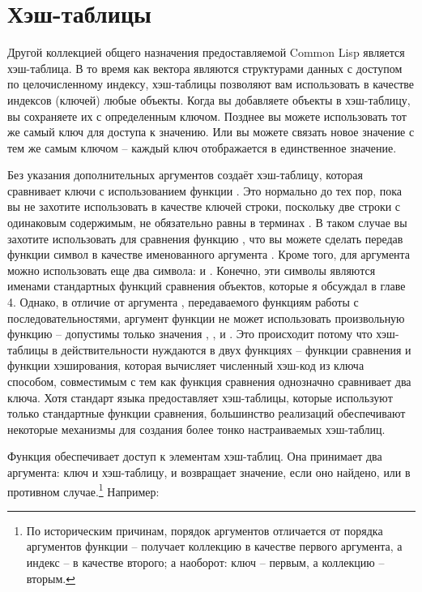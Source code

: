 \section{Хэш-таблицы}

Другой коллекцией общего назначения предоставляемой Common Lisp является хэш-таблица.  В
то время как вектора являются структурами данных с доступом по целочисленному индексу,
хэш-таблицы позволяют вам использовать в качестве индексов (ключей) любые объекты.  Когда
вы добавляете объекты в хэш-таблицу, вы сохраняете их с определенным ключом.  Позднее вы
можете использовать тот же самый ключ для доступа к значению.  Или вы можете связать новое
значение с тем же самым ключом -- каждый ключ отображается в единственное значение.

Без указания дополнительных аргументов  создаёт хэш-таблицу, которая
сравнивает ключи с использованием функции .  Это нормально до тех пор, пока вы
не захотите использовать в качестве ключей строки, поскольку две строки с одинаковым
содержимым, не обязательно равны в терминах .  В таком случае вы захотите
использовать для сравнения функцию , что вы можете сделать передав функции
 символ  в качестве именованного аргумента .
Кроме того, для аргумента  можно использовать еще два символа:  и
.  Конечно, эти символы являются именами стандартных функций сравнения
объектов, которые я обсуждал в главе 4.  Однако, в отличие от аргумента ,
передаваемого функциям работы с последовательностями, аргумент  функции
 не может использовать произвольную функцию -- допустимы только
значения , ,  и .  Это происходит потому что
хэш-таблицы в действительности нуждаются в двух функциях -- функции сравнения и функции
хэширования, которая вычисляет численный хэш-код из ключа способом, совместимым с тем как
функция сравнения однозначно сравнивает два ключа.  Хотя стандарт языка предоставляет
хэш-таблицы, которые используют только стандартные функции сравнения, большинство
реализаций обеспечивают некоторые механизмы для создания более тонко настраиваемых
хэш-таблиц.

Функция  обеспечивает доступ к элементам хэш-таблиц.  Она принимает два
аргумента: ключ и хэш-таблицу, и возвращает значение, если оно найдено, или  в
противном случае.\footnote{По историческим причинам, порядок аргументов 
  отличается от порядка аргументов функции  --  получает коллекцию в
  качестве первого аргумента, а индекс -- в качестве второго; а  наоборот:
  ключ -- первым, а коллекцию -- вторым.}  Например:


